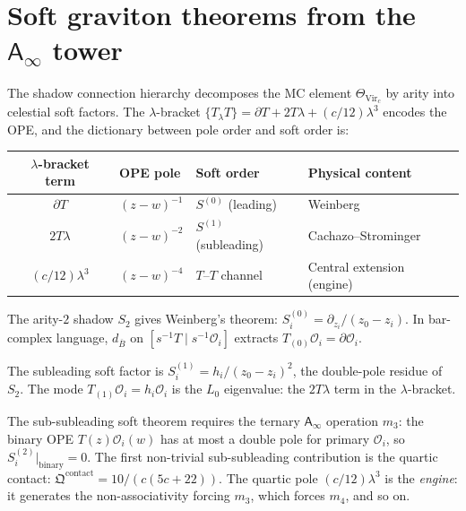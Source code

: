 \documentclass[11pt]{article}
\newcommand{\cO}{\mathcal{O}}
\newcommand{\barB}{\overline{B}}
\newcommand{\Ainf}{\mathsf{A}_{\infty}}
\begin{document}

\section{Soft graviton theorems from the $\Ainf$ tower}
\label{sec:soft-graviton-ainf}

The shadow connection hierarchy decomposes the MC element
$\Theta_{\mathrm{Vir}_c}$ by arity into celestial soft factors.
The $\lambda$-bracket
$\{T{}_\lambda T\} = \partial T + 2T\lambda + (c/12)\lambda^3$
encodes the OPE, and the dictionary between pole order and soft
order is:

\begin{center}
\renewcommand{\arraystretch}{1.2}
\begin{tabular}{clll}
\textbf{$\lambda$-bracket term} &
\textbf{OPE pole} &
\textbf{Soft order} &
\textbf{Physical content} \\
\hline
$\partial T$ & $(z{-}w)^{-1}$ & $S^{(0)}$ (leading) &
  Weinberg \\[2pt]
$2T\lambda$ & $(z{-}w)^{-2}$ & $S^{(1)}$ (subleading) &
  Cachazo--Strominger \\[2pt]
$(c/12)\lambda^3$ & $(z{-}w)^{-4}$ &
  $T$--$T$ channel & Central extension (engine)
\end{tabular}
\end{center}

\begin{theorem}[Leading soft = $S_2$ simple pole; proved here]
\label{thm:weinberg-from-bar}
The arity-$2$ shadow $S_2$ gives Weinberg's theorem:
$S^{(0)}_i = \partial_{z_i}/(z_0 - z_i)$.
In bar-complex language, $d_{\barB}$ on $[s^{-1}T \mid s^{-1}\cO_i]$
extracts $T_{(0)}\cO_i = \partial\cO_i$.
\end{theorem}

\begin{theorem}[Subleading soft = $S_2$ double pole; proved here]
\label{thm:cs-subleading-from-bar}
The subleading soft factor is $S^{(1)}_i = h_i/(z_0 - z_i)^2$,
the double-pole residue of $S_2$.  The mode $T_{(1)}\cO_i = h_i\cO_i$
is the $L_0$ eigenvalue: the $2T\lambda$ term in the $\lambda$-bracket.
\end{theorem}

\begin{theorem}
\label{thm:sub-subleading-m3}
The sub-subleading soft theorem requires the ternary $\Ainf$
operation $m_3$: the binary OPE $T(z)\cO_i(w)$ has at most a double
pole for primary $\cO_i$, so $S^{(2)}_i|_{\text{binary}} = 0$.
The first non-trivial sub-subleading contribution is the quartic
contact: $\mathfrak{Q}^{\mathrm{contact}} = 10/(c(5c+22))$.
The quartic pole $(c/12)\lambda^3$ is the \emph{engine}: it generates
the non-associativity forcing $m_3$, which forces $m_4$, and so on.
\end{theorem}
\end{document}
